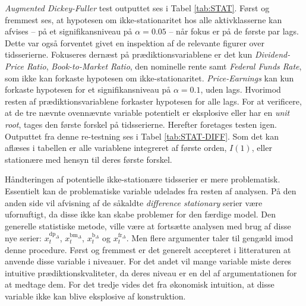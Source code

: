 \documentclass[
  a4paper,
  oneside]{memoir}
\begin{document}
\emph{Augmented Dickey-Fuller} test outputtet ses i Tabel \ref{tab:STAT}. Først og fremmest ses, at hypotesen om ikke-stationaritet hos alle aktivklasserne kan afvises -- på et signifikansniveau på \(\alpha=0.05\) -- når fokus er på de første par lags. Dette var også forventet givet en inspektion af de relevante figurer over tidsserierne. Fokuseres dernæst på prædiktionsvariablene er det kun \emph{Dividend-Price Ratio}, \emph{Book-to-Market Ratio}, den nominelle rente samt \emph{Federal Funds Rate}, som ikke kan forkaste hypotesen om ikke-stationaritet. \emph{Price-Earnings} kan kun forkaste hypotesen for et signifikansniveau på \(\alpha=0.1\), uden lags. Hvorimod resten af prædiktionsvariablene forkaster hypotesen for alle lags. For at verificere, at de tre nævnte ovennævnte variable potentielt er eksplosive eller har en \emph{unit root}, tages den første forskel på tidsserierne. Herefter foretages testen igen. Outputtet fra denne re-testning ses i Tabel \ref{tab:STAT-DIFF}. Som det kan aflæses i tabellen er alle variablene integreret af første orden, \(I(1)\), eller stationære med hensyn til deres første forskel.

Håndteringen af potentielle ikke-stationære tidsserier er mere problematisk. Essentielt kan de problematiske variable udelades fra resten af analysen. På den anden side vil afvisning af de såkaldte \emph{difference stationary} serier være ufornuftigt, da disse ikke kan skabe problemer for den færdige model. Den generelle statistiske metode, ville være at fortsætte analysen med brug af disse nye serier: \(x_t^{\text{dp}_{\Delta}}\), \(x_t^{\text{bm}_{\Delta}}\), \(x_t^{\text{b}_{\Delta}}\) og \(x_t^{\text{fr}_{\Delta}}\). Men flere argumenter taler til gengæld imod denne procedure. Først og fremmest er det generelt accepteret i litteraturen at anvende disse variable i niveauer. For det andet vil mange variable miste deres intuitive prædiktionskvaliteter, da deres niveau er en del af argumentationen for at medtage dem. For det tredje vides det fra økonomisk intuition, at disse variable ikke kan blive eksplosive af konstruktion.
\end{document}
